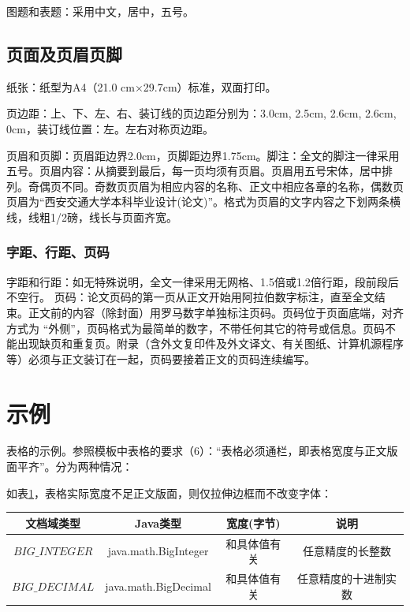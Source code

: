 图题和表题：采用中文，居中，五号。
\subsection{页面及页眉页脚}
纸张：纸型为A4（21.0 cm×29.7cm）标准，双面打印。

页边距：上、下、左、右、装订线的页边距分别为：3.0cm, 2.5cm, 2.6cm, 2.6cm, 0cm，装订线位置：左。左右对称页边距。

页眉和页脚：页眉距边界2.0cm，页脚距边界1.75cm。脚注：全文的脚注一律采用五号。页眉内容：从摘要到最后，每一页均须有页眉。页眉用五号宋体，居中排列。奇偶页不同。奇数页页眉为相应内容的名称、正文中相应各章的名称，偶数页页眉为“西安交通大学本科毕业设计(论文)”。格式为页眉的文字内容之下划两条横线，线粗1/2磅，线长与页面齐宽。
\subsubsection{字距、行距、页码}
字距和行距：如无特殊说明，全文一律采用无网格、1.5倍或1.2倍行距，段前段后不空行。
页码：论文页码的第一页从正文开始用阿拉伯数字标注，直至全文结束。正文前的内容（除封面）用罗马数字单独标注页码。页码位于页面底端，对齐方式为 “外侧”，页码格式为最简单的数字，不带任何其它的符号或信息。页码不能出现缺页和重复页。附录（含外文复印件及外文译文、有关图纸、计算机源程序等）必须与正文装订在一起，页码要接着正文的页码连续编写。




\section{示例}
表格的示例。参照模板中表格的要求（6）：“表格必须通栏，即表格宽度与正文版面平齐”。分为两种情况：

如表\ref{tab:example1}，表格实际宽度不足正文版面，则仅拉伸边框而不改变字体：
\begin{table}[htbp]\small
  \centering
  \begin{tabular*}{\textwidth}{@{}@{\extracolsep{\fill}}cccc@{}}%
    \toprule[1.5pt]
    \textbf{文档域类型} & \textbf{Java类型} & \textbf{宽度(字节)} & \textbf{说明} \\
    \midrule[1pt]
    $BIG\_INTEGER$& java.math.BigInteger & 和具体值有关 & 任意精度的长整数 \\
    $BIG\_DECIMAL$ & java.math.BigDecimal & 和具体值有关 & 任意精度的十进制实数 \\
    \bottomrule[1.5pt]
  \end{tabular*}
  \label{tab:example1}
\end{table}

